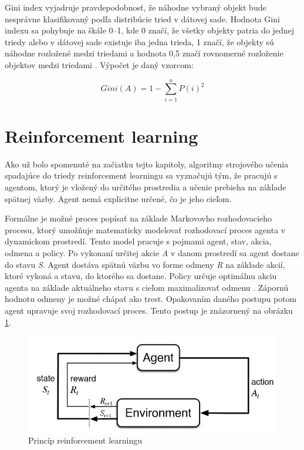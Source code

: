 \documentclass[slovak, master]{diploma}
\begin{document}
Gini index vyjadruje pravdepodobnosť, že náhodne vybraný objekt bude nesprávne klasifikovaný podľa distribúcie tried v dátovej sade. Hodnota Gini indexu sa pohybuje na škále 0--1, kde 0 značí, že všetky objekty patria do jednej triedy alebo v dátovej sade existuje iba jedna trieda, 1 značí, že objekty sú náhodne rozložené medzi triedami a hodnota 0,5 značí rovnomerné rozloženie objektov medzi triedami \cite{Gini}. Výpočet je daný vzorcom:

\[Gini(A) = 1 - \displaystyle\sum\limits_{i=1}^n P(i)^2\]

\section{Reinforcement learning}
\label{sec:ReinfoOverview}
Ako už bolo spomenuté na začiatku tejto kapitoly, algoritmy strojového učenia spadajúce do triedy reinforcement learningu sa vyznačujú tým, že pracujú s agentom, ktorý je vložený do určitého prostredia a učenie prebieha na základe spätnej väzby. Agent nemá explicitne určené, čo je jeho cieľom. 

Formálne je možné proces popísať na základe Markovovho rozhodovacieho procesu, ktorý umožňuje matematicky modelovať rozhodovací proces agenta v dynamickom prostredí. Tento model pracuje s pojmami agent, stav, akcia, odmena a policy. Po vykonaní určitej akcie \textit{A} v danom prostredí sa agent dostane do stavu \textit{S}. Agent dostáva spätnú väzbu vo forme odmeny \textit{R} na základe akcií, ktoré vykoná a stavu, do ktorého sa dostane. Policy určuje optimálnu akciu agenta na základe aktuálneho stavu s cieľom maximalizovať odmenu \cite{Markov}. Zápornú hodnotu odmeny je možné chápať ako trest. Opakovaním daného postupu potom agent upravuje svoj rozhodovací proces. Tento postup je znázornený na obrázku \ref{pic:reinfoPic}.
  
\begin{figure}[!htbp]
    \centering
    \includegraphics[width=.8\textwidth]{Figures/reinfoGraph.png}
    \caption{Princíp reinforcement learningu \cite{reinfoGraph}}
    \label{pic:reinfoPic}
\end{figure}
\end{document}
